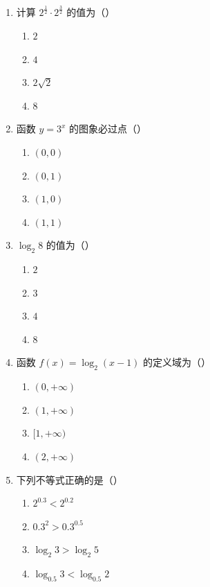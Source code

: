 \documentclass[12pt, a4paper]{ctexart}
\begin{document}
\begin{enumerate}
\item 计算 $2^{\frac{1}{2}}\cdot 2^{\frac{3}{2}}$ 的值为（\quad）
  \begin{enumerate}[label=\Alph*., itemsep=0pt]
    \item $2$ \quad \item $4$ \quad \item $2\sqrt{2}$ \quad \item $8$
  \end{enumerate}

\item 函数 $y=3^x$ 的图象必过点（\quad）
  \begin{enumerate}[label=\Alph*., itemsep=0pt]
    \item $(0,0)$ \quad \item $(0,1)$ \quad \item $(1,0)$ \quad \item $(1,1)$
  \end{enumerate}

\item $\log_2 8$ 的值为（\quad）
  \begin{enumerate}[label=\Alph*., itemsep=0pt]
    \item $2$ \quad \item $3$ \quad \item $4$ \quad \item $8$
  \end{enumerate}

\item 函数 $f(x)=\log_2(x-1)$ 的定义域为（\quad）
  \begin{enumerate}[label=\Alph*., itemsep=0pt]
    \item $(0,+\infty)$ \quad \item $(1,+\infty)$ \quad \item $[1,+\infty)$ \quad \item $(2,+\infty)$
  \end{enumerate}

\item 下列不等式正确的是（\quad）
  \begin{enumerate}[label=\Alph*., itemsep=0pt]
    \item $2^{0.3}<2^{0.2}$ \quad \item $0.3^2>0.3^{0.5}$
    \item $\log_2 3>\log_2 5$ \quad \item $\log_{0.5} 3<\log_{0.5} 2$
  \end{enumerate}


\end{enumerate}
\end{document}
